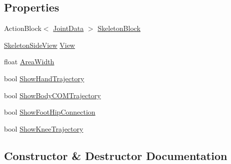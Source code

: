 \subsection*{Properties}
\begin{DoxyCompactItemize}
\item 
Action\+Block$<$ \hyperlink{struct_rowing_monitor_1_1_model_1_1_util_1_1_joint_data}{Joint\+Data} $>$ \hyperlink{class_rowing_monitor_1_1_model_1_1_pipeline_1_1_skeleton_side_display_a6b8216c1f921a661999c1f9e419a70b1}{Skeleton\+Block}
\item 
\hyperlink{class_rowing_monitor_1_1_view_1_1_skeleton_side_view}{Skeleton\+Side\+View} \hyperlink{class_rowing_monitor_1_1_model_1_1_pipeline_1_1_skeleton_side_display_ad3a2bc2fd40be1be27bc7a6e081e4993}{View}
\item 
float \hyperlink{class_rowing_monitor_1_1_model_1_1_pipeline_1_1_skeleton_side_display_a0d3755d630c80878a72d5f7ef598983f}{Area\+Width}
\item 
bool \hyperlink{class_rowing_monitor_1_1_model_1_1_pipeline_1_1_skeleton_side_display_a09ff87b46af582c486dab5ed3bab5aec}{Show\+Hand\+Trajectory}
\item 
bool \hyperlink{class_rowing_monitor_1_1_model_1_1_pipeline_1_1_skeleton_side_display_a0d609dc0262350737aaf01b5e4588076}{Show\+Body\+C\+O\+M\+Trajectory}
\item 
bool \hyperlink{class_rowing_monitor_1_1_model_1_1_pipeline_1_1_skeleton_side_display_a0c914a7629c874ae9b23137754938959}{Show\+Foot\+Hip\+Connection}
\item 
bool \hyperlink{class_rowing_monitor_1_1_model_1_1_pipeline_1_1_skeleton_side_display_a9e69f5b1f04aea33ec07b36236989f58}{Show\+Knee\+Trajectory}
\end{DoxyCompactItemize}


\subsection{Constructor \& Destructor Documentation}
\mbox{\label{class_rowing_monitor_1_1_model_1_1_pipeline_1_1_skeleton_side_display_aa9cea6100e45eb5dd9ce60141287659d}} 
